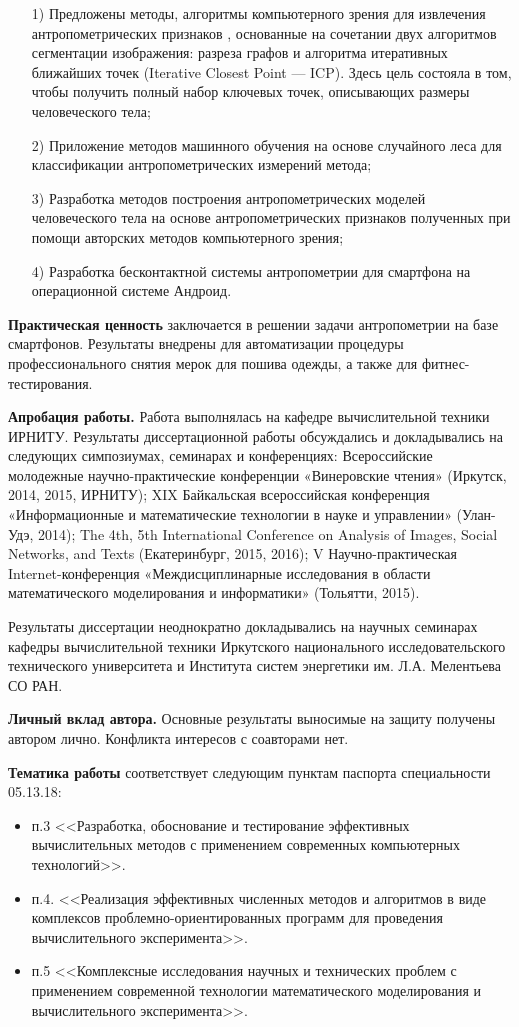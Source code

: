 \begin{enumerate}
	\item[1)] Предложены методы, алгоритмы компьютерного зрения для извлечения антропометрических признаков , основанные на сочетании двух алгоритмов сегментации изображения: разреза графов и алгоритма итеративных ближайших точек (Iterative Closest Point — ICP). Здесь цель состояла в том, чтобы получить полный набор ключевых точек, описывающих размеры человеческого тела;
	\item[2)] Приложение методов машинного обучения на основе случайного леса для классификации антропометрических измерений метода;
	\item[3)] Разработка методов построения антропометрических моделей человеческого тела на основе антропометрических признаков полученных при помощи авторских методов компьютерного зрения;
	\item[4)] Разработка бесконтактной системы антропометрии для смартфона на операционной системе Андроид.
\end{enumerate}

\textbf{Практическая ценность} заключается в решении задачи антропометрии на базе смартфонов. Результаты внедрены для автоматизации процедуры профессионального снятия мерок для пошива одежды, а также для фитнес-тестирования.

\textbf{Апробация работы.} Работа выполнялась на кафедре вычислительной техники ИРНИТУ. Результаты диссертационной работы обсуждались и докладывались на следующих симпозиумах, семинарах и конференциях: Всероссийские молодежные научно-практические конференции «Винеровские чтения» (Иркутск, 2014, 2015, ИРНИТУ); XIX Байкальская всероссийская конференция «Информационные и математические технологии в науке и управлении» (Улан-Удэ, 2014); The 4th, 5th International Conference on Analysis of Images, Social Networks, and Texts (Екатеринбург, 2015, 2016); V Научно-практическая Internet-конференция «Междисциплинарные исследования в области математического моделирования и информатики» (Тольятти, 2015).

Результаты диссертации неоднократно докладывались на научных семинарах кафедры вычислительной техники Иркутского национального исследовательского технического университета и Института систем энергетики им. Л.А. Мелентьева СО РАН.


\textbf{Личный вклад автора.} Основные результаты выносимые на защиту получены автором лично. Конфликта интересов с соавторами нет.

\textbf{Тематика работы} соответствует следующим пунктам паспорта специальности 05.13.18:
\begin{itemize}
	\item п.3 <<Разработка, обоснование и тестирование эффективных вычислительных методов с применением современных компьютерных технологий>>.
	\item п.4. <<Реализация эффективных численных методов и алгоритмов в виде комплексов проблемно-ориентированных программ для проведения вычислительного эксперимента>>.
	\item п.5 <<Комплексные исследования научных и технических проблем с применением современной технологии математического моделирования и вычислительного эксперимента>>.
\end{itemize}

